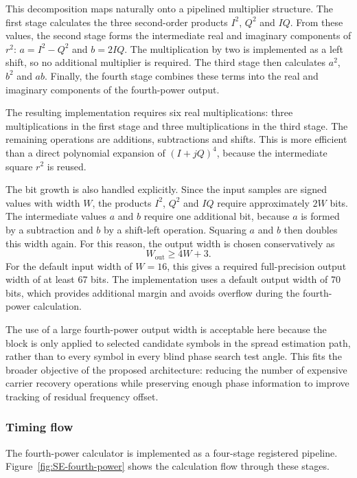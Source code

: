 This decomposition maps naturally onto a pipelined multiplier structure. The first stage 
calculates the three second-order products $I^2$, $Q^2$ and $IQ$. From these values, the 
second stage forms the intermediate real and imaginary components of $r^2$: $a=I^2-Q^2$ 
and $b=2IQ$. The multiplication by two is implemented as a left shift, so no additional 
multiplier is required. The third stage then calculates $a^2$, $b^2$ and $ab$. Finally, the 
fourth stage combines these terms into the real and imaginary components of the fourth-power 
output.

The resulting implementation requires six real multiplications: three multiplications in the 
first stage and three multiplications in the third stage. The remaining operations are 
additions, subtractions and shifts. This is more efficient than a direct polynomial expansion 
of $(I+jQ)^4$, because the intermediate square $r^2$ is reused.

The bit growth is also handled explicitly. Since the input samples are signed values with 
width $W$, the products $I^2$, $Q^2$ and $IQ$ require approximately $2W$ bits. The 
intermediate values $a$ and $b$ require one additional bit, because $a$ is formed by a 
subtraction and $b$ by a shift-left operation. Squaring $a$ and $b$ then doubles this width 
again. For this reason, the output width is chosen conservatively as
\begin{equation}
    W_{\mathrm{out}} \geq 4W + 3 .
\end{equation}
For the default input width of $W=16$, this gives a required full-precision output width of 
at least 67 bits. The implementation uses a default output width of 70 bits, which provides 
additional margin and avoids overflow during the fourth-power calculation.

The use of a large fourth-power output width is acceptable here because the block is only 
applied to selected candidate symbols in the spread estimation path, rather than to every 
symbol in every blind phase search test angle. This fits the broader objective of the proposed 
architecture: reducing the number of expensive carrier recovery operations while preserving 
enough phase information to improve tracking of residual frequency offset.

\subsubsection{Timing flow}

The fourth-power calculator is implemented as a four-stage registered pipeline. Figure~\ref{fig:SE-fourth-power} shows the calculation flow through these stages.

